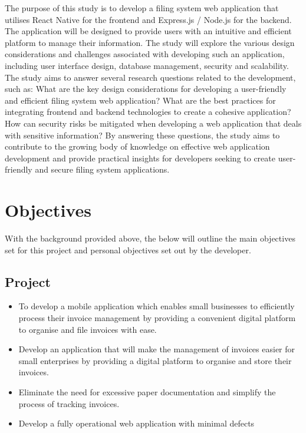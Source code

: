 \newline \newline
The purpose of this study is to develop a filing system web application that utilises React Native for the frontend and Express.js / Node.js for the backend. The application will be designed to provide users with an intuitive and efficient platform to manage their information. The study will explore the various design considerations and challenges associated with developing such an application, including user interface design, database management, security and scalability. The study aims to answer several research questions related to the development, such as: What are the key design considerations for developing a user-friendly and efficient filing system web application? What are the best practices for integrating frontend and backend technologies to create a cohesive application? How can security risks be mitigated when developing a web application that deals with sensitive information? By answering these questions, the study aims to contribute to the growing body of knowledge on effective web application development and provide practical insights for developers seeking to create user-friendly and secure filing system applications.

\section{Objectives} 

With the background provided above, the below will outline the main objectives set for this project and personal objectives set out by the developer.
\subsection{Project}
\begin{itemize}
    \item To develop a mobile application which enables small businesses to efficiently process their invoice management by providing a convenient digital platform to organise and file invoices with ease.
    \item Develop an application that will make the management of invoices easier for small enterprises by providing a digital platform to organise and store their invoices. 
    \item Eliminate the need for excessive paper documentation and simplify the process of tracking invoices.
    \item Develop a fully operational web application with minimal defects 
\end{itemize}

